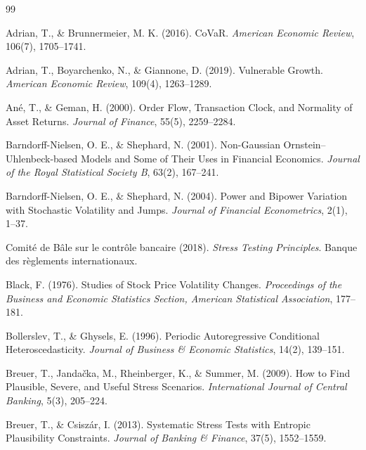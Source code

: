 \documentclass[11pt]{article}
\theoremstyle{definition}
\begin{document}
\renewcommand{\refname}{Références}
\begin{thebibliography}{99}
\footnotesize
\setlength{\itemsep}{0pt}

 Adrian, T., \& Brunnermeier, M. K. (2016). CoVaR. \textit{American Economic Review}, 106(7), 1705--1741.

 Adrian, T., Boyarchenko, N., \& Giannone, D. (2019). Vulnerable Growth. \textit{American Economic Review}, 109(4), 1263--1289.

 Ané, T., \& Geman, H. (2000). Order Flow, Transaction Clock, and Normality of Asset Returns. \textit{Journal of Finance}, 55(5), 2259--2284.

 Barndorff-Nielsen, O. E., \& Shephard, N. (2001). Non-Gaussian Ornstein--Uhlenbeck-based Models and Some of Their Uses in Financial Economics. \textit{Journal of the Royal Statistical Society B}, 63(2), 167--241.

 Barndorff-Nielsen, O. E., \& Shephard, N. (2004). Power and Bipower Variation with Stochastic Volatility and Jumps. \textit{Journal of Financial Econometrics}, 2(1), 1--37.

 Comité de Bâle sur le contrôle bancaire (2018). \textit{Stress Testing Principles}. Banque des règlements internationaux.

 Black, F. (1976). Studies of Stock Price Volatility Changes. \textit{Proceedings of the Business and Economic Statistics Section, American Statistical Association}, 177--181.

 Bollerslev, T., \& Ghysels, E. (1996). Periodic Autoregressive Conditional Heteroscedasticity. \textit{Journal of Business \& Economic Statistics}, 14(2), 139--151.

 Breuer, T., Jandačka, M., Rheinberger, K., \& Summer, M. (2009). How to Find Plausible, Severe, and Useful Stress Scenarios. \textit{International Journal of Central Banking}, 5(3), 205--224.

 Breuer, T., \& Csiszár, I. (2013). Systematic Stress Tests with Entropic Plausibility Constraints. \textit{Journal of Banking \& Finance}, 37(5), 1552--1559.


\end{thebibliography}
\end{document}
